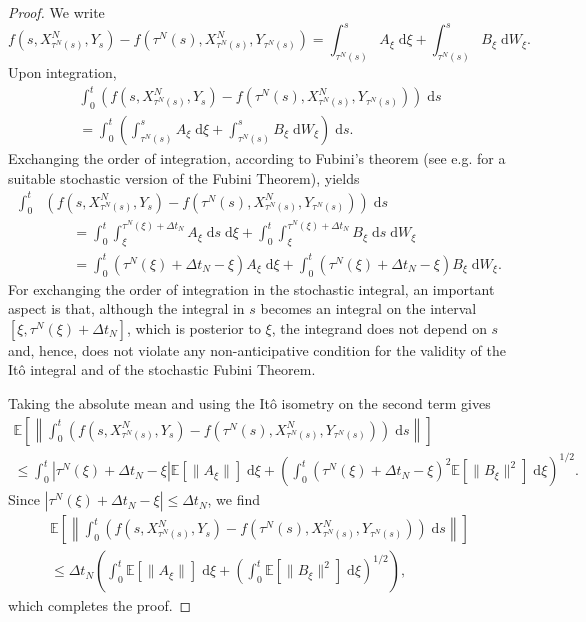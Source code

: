 \documentclass[reqno,12pt]{amsart}
\theoremstyle{plain} %
\theoremstyle{definition} %
\begin{document}
\begin{proof}
    We write
    \[
        f(s, X_{\tau^N(s)}^N, Y_s) - f(\tau^N(s), X_{\tau^N(s)}^N, Y_{\tau^N(s)}) = \int_{\tau^N(s)}^s A_\xi \;\mathrm{d}\xi + \int_{\tau^N(s)}^s B_\xi \;\mathrm{d}W_\xi.
    \]
    Upon integration,
    \begin{multline*}
        \int_0^t \left(f(s, X_{\tau^N(s)}^N, Y_s) - f(\tau^N(s), X_{\tau^N(s)}^N, Y_{\tau^N(s)})\right)\;\mathrm{d}s  \\
        = \int_0^t \left(\int_{\tau^N(s)}^s A_\xi \;\mathrm{d}\xi + \int_{\tau^N(s)}^s B_\xi \;\mathrm{d}W_\xi\right)\;\mathrm{d}s.
    \end{multline*}
    Exchanging the order of integration, according to Fubini's theorem (see e.g. \cite[Section IV.6]{Protter2005} for a suitable stochastic version of the Fubini Theorem), yields
    \begin{align*}
        \int_0^t & \left(f(s, X_{\tau^N(s)}^N, Y_s) - f(\tau^N(s), X_{\tau^N(s)}^N, Y_{\tau^N(s)})\right)\;\mathrm{d}s \\
        & \qquad = \int_0^t \int_\xi^{\tau^N(\xi)+\Delta t_N} A_\xi \;\mathrm{d}s\;\mathrm{d}\xi + \int_0^t \int_\xi^{\tau^N(\xi) + \Delta t_N} B_\xi \;\mathrm{d}s\;\mathrm{d}W_\xi \\
        & \qquad = \int_0^t (\tau^N(\xi)+\Delta t_N - \xi) A_\xi \;\mathrm{d}\xi + \int_0^t (\tau^N(\xi) + \Delta t_N - \xi) B_\xi \;\mathrm{d}W_\xi.
    \end{align*}
    For exchanging the order of integration in the stochastic integral, an important aspect is that, although the integral in $s$ becomes an integral on the interval $[\xi, \tau^N(\xi) + \Delta t_N]$, which is posterior to $\xi$, the integrand does not depend on $s$ and, hence, does not violate any non-anticipative condition for the validity of the It\^o integral and of the stochastic Fubini Theorem.

    Taking the absolute mean and using the It\^o isometry \cite{Oksendal2003} on the second term gives
    \begin{multline*}
        \mathbb{E}\left[\left\|\int_0^t \left(f(s, X_{\tau^N(s)}^N, Y_s) - f(\tau^N(s), X_{\tau^N(s)}^N, Y_{\tau^N(s)})\right)\;\mathrm{d}s\right\|\right]  \\
        \leq \int_0^t |\tau^N(\xi)+\Delta t_N - \xi| \mathbb{E}[\|A_\xi\|] \;\mathrm{d}\xi + \left(\int_0^t (\tau^N(\xi) + \Delta t_N - \xi)^2 \mathbb{E}[\|B_\xi\|^2] \;\mathrm{d}\xi \right)^{1/2}.
    \end{multline*}
    Since $|\tau^N(\xi)+\Delta t_N - \xi| \leq \Delta t_N$, we find
    \begin{multline*}
        \mathbb{E}\left[\left\|\int_0^t \left(f(s, X_{\tau^N(s)}^N, Y_s) - f(\tau^N(s), X_{\tau^N(s)}^N, Y_{\tau^N(s)})\right)\;\mathrm{d}s\right\|\right]  \\
        \leq \Delta t_N \left(\int_0^t \mathbb{E}[\|A_\xi\|] \;\mathrm{d}\xi + \left(\int_0^t \mathbb{E}[\|B_\xi\|^2] \;\mathrm{d}\xi \right)^{1/2}\right),
    \end{multline*}
    which completes the proof.
\end{proof}
\end{document}
